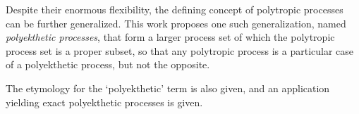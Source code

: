    Despite their enormous flexibility, the defining concept  of  polytropic  processes  can  be
    further generalized. This work proposes one such  generalization,  named  \emph{polyekthetic
    processes}, that form a larger process set of which the polytropic process set is  a  proper
    subset, so that any polytropic process is a particular case of a polyekthetic  process,  but
    not the opposite.

    The etymology for the `polyekthetic' term is also given, and an application  yielding  exact
    polyekthetic processes is given.


